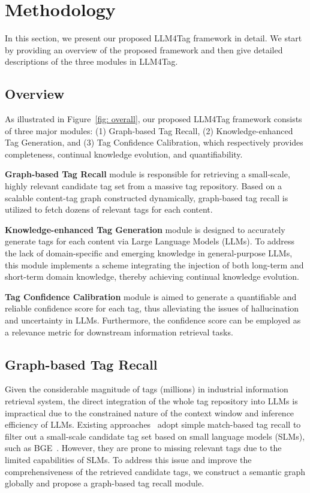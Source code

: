 
\section{Methodology}
In this section, we present our proposed LLM4Tag framework in detail. We start by providing an overview of the proposed framework and then give detailed descriptions of the three modules in LLM4Tag.

\subsection{Overview}
As illustrated in Figure~\ref{fig: overall}, our proposed LLM4Tag framework consists of three major modules: (1) Graph-based Tag Recall, (2) Knowledge-enhanced Tag Generation, and (3) Tag Confidence Calibration, which respectively provides completeness, continual knowledge evolution, and quantifiability.

\textbf{Graph-based Tag Recall} module is responsible for retrieving a small-scale, highly relevant candidate tag set from a massive tag repository. Based on a scalable content-tag graph constructed dynamically, graph-based tag recall is utilized to fetch dozens of relevant tags for each content. 

\textbf{Knowledge-enhanced Tag Generation} module is designed to accurately generate tags for each content via Large Language Models (LLMs). To address the lack of domain-specific and emerging knowledge in general-purpose LLMs, this module implements a scheme integrating the injection of both long-term and short-term domain knowledge, thereby achieving continual knowledge evolution.

\textbf{Tag Confidence Calibration} module is aimed to generate a quantifiable and reliable confidence score for each tag, thus alleviating the issues of hallucination and uncertainty in LLMs. Furthermore, the confidence score can be employed as a relevance metric for downstream information retrieval tasks.



\subsection{Graph-based Tag Recall}
Given the considerable magnitude of tags (millions) in industrial information retrieval system, the direct integration of the whole tag repository into LLMs is impractical due to the constrained nature of the context window and inference efficiency of LLMs. 
Existing approaches~\cite{li2023taggpt,zhu2023icxml} adopt simple match-based tag recall to filter out a small-scale candidate tag set based on small language models (SLMs), such as BGE~\cite{bge}. However, they are prone to missing relevant tags due to the limited capabilities of SLMs. 
To address this issue and improve the comprehensiveness of the retrieved candidate tags, we construct a semantic graph globally and propose a graph-based tag recall module. 


